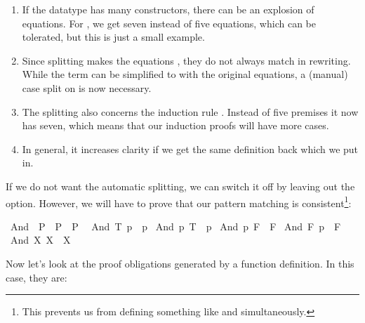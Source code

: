 \begin{isabellebody}
\begin{isamarkuptext}
  \begin{enumerate}
  \item If the datatype has many constructors, there can be an
  explosion of equations. For , we get seven instead of
  five equations, which can be tolerated, but this is just a small
  example.

  \item Since splitting makes the equations , they
  do not always match in rewriting. While the term 
  can be simplified to  with the original equations, a
  (manual) case split on  is now necessary.

  \item The splitting also concerns the induction rule . Instead of five premises it now has seven, which
  means that our induction proofs will have more cases.

  \item In general, it increases clarity if we get the same definition
  back which we put in.
  \end{enumerate}

  If we do not want the automatic splitting, we can switch it off by
  leaving out the  option. However, we will have to
  prove that our pattern matching is consistent\footnote{This prevents
  us from defining something like  and  simultaneously.}:%
\end{isamarkuptext}%
\isamarkuptrue%
\isamarkupfalse%
\ And{}\ {\isacharcolon}{\isacharcolon}\ {\isachardoublequoteopen}P{}\ {\isasymRightarrow}\ P{}\ {\isasymRightarrow}\ P{}{\isachardoublequoteclose}\isanewline
{}\isanewline
\ \ {\isachardoublequoteopen}And{}\ T\ p\ {\isacharequal}\ p{\isachardoublequoteclose}\isanewline
{\isacharbar}\ {\isachardoublequoteopen}And{}\ p\ T\ {\isacharequal}\ p{\isachardoublequoteclose}\isanewline
{\isacharbar}\ {\isachardoublequoteopen}And{}\ p\ F\ {\isacharequal}\ F{\isachardoublequoteclose}\isanewline
{\isacharbar}\ {\isachardoublequoteopen}And{}\ F\ p\ {\isacharequal}\ F{\isachardoublequoteclose}\isanewline
{\isacharbar}\ {\isachardoublequoteopen}And{}\ X\ X\ {\isacharequal}\ X{\isachardoublequoteclose}%
\isadelimproof
%
\endisadelimproof
%
\isatagproof
%
\begin{isamarkuptxt}%
\noindent Now let's look at the proof obligations generated by a
  function definition. In this case, they are:


\end{isamarkuptxt}
\end{isabellebody}
